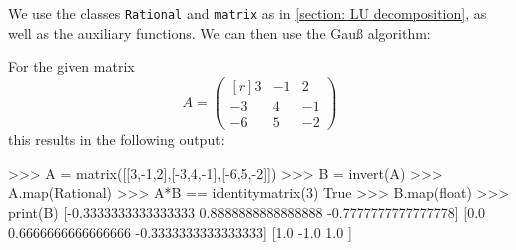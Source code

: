 \section{}

We use the classes \texttt{Rational} and \texttt{matrix} as in \ref{section: LU decomposition}, as well as the auxiliary functions.
We can then use the Gauß algorithm:



For the given matrix
\[
  A
  = \begin{pmatrix*}[r]
       3  & -1  &  2  \\
      -3  &  4  & -1  \\
      -6  &  5  & -2
    \end{pmatrix*}
\]
this results in the following output:
\begin{consoleoutput}
>>> A = matrix([[3,-1,2],[-3,4,-1],[-6,5,-2]])
>>> B = invert(A)
>>> A.map(Rational)
>>> A*B == identitymatrix(3)
True
>>> B.map(float)
>>> print(B)
[-0.3333333333333333 0.8888888888888888 -0.7777777777777778]
[0.0                 0.6666666666666666 -0.3333333333333333]
[1.0                 -1.0               1.0                ]
\end{consoleoutput}
